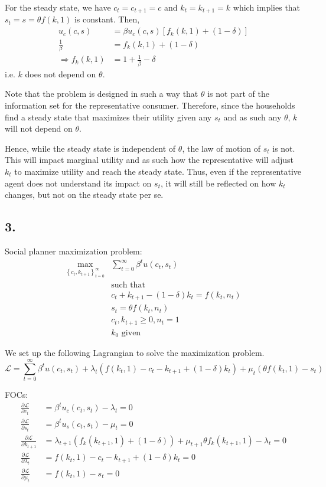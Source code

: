 \documentclass[12pt]{article}
\theoremstyle{definition}
\newcommand\st{\text{such that }}
\newcommand{\cbra}[1]{\left\{#1\right\}}
\begin{document}
For the steady state, we have $c_t=c_{t+1}=c$ and $k_t=k_{t+1}=k$ which implies that $s_t=s =\theta f(k,1)$ is constant. Then,
\begin{align*}
	u_c(c,s) & =\beta u_c(c,s)\left[f_k(k,1) + (1-\delta) \right]  \\
	\frac{1}{\beta} &= f_k(k,1) + (1-\delta)\\
	\Rightarrow f_k(k,1) &= 1 + \frac{1}{\beta} -\delta
\end{align*}
i.e. $k$ does not depend on $\theta$.

Note that the problem is designed in such a way that $\theta$ is not part of the information set for the representative consumer. Therefore, since the households find a steady state that maximizes their utility given any $s_t$ and as such any $\theta$, $k$ will not depend on $\theta$.

Hence, while the steady state is independent of $\theta$, the law of motion of $s_t$ is not. This will impact marginal utility and as such how the representative will adjust $k_t$ to maximize utility and reach the steady state. Thus, even if the representative agent does not understand its impact on $s_t$, it will still be reflected on how $k_t$ changes, but not on the steady state per se.

\subsection*{3.}

Social planner maximization problem:
	\begin{align*}
\max_{\cbra{c_t,k_{t+1}}_{t=0}^\infty} &\sum_{t=0}^{\infty}\beta^t u(c_t,s_t)\\
&\st\\
& c_t+k_{t+1}-(1-\delta)k_t = f(k_t,n_t)\\
& s_t=\theta f(k_t,n_t)\\
& c_t,k_{t+1}\geq 0, n_t=1\\
& k_0 \text{ given}
\end{align*}

We set up the following Lagrangian to solve the maximization problem.
\[
\mathcal{L} = \sum_{t=0}^{\infty}\beta^t u(c_t,s_t) + \lambda_t \left(  f(k_t,1)- c_t-k_{t+1}+(1-\delta)k_t \right) + \mu_t \left( \theta f(k_t,1) - s_t \right)
\]

FOCs:
\begin{align*}
\frac{\partial \mathcal{L}}{\partial c_t}& = \beta^tu_c(c_t,s_t) -\lambda_t = 0 \\
\frac{\partial \mathcal{L}}{\partial s_t}& = \beta^tu_s(c_t,s_t) -\mu_t = 0 \\
\frac{\partial \mathcal{L}}{\partial k_{t+1}} &= \lambda_{t+1} \left( f_k(k_{t+1},1) + (1-\delta)\right) +\mu_{t+1}\theta f_k(k_{t+1},1) - \lambda_t = 0\\
\frac{\partial \mathcal{L}}{\partial \lambda_t} &= f(k_t,1)- c_t-k_{t+1}+(1-\delta)k_t = 0\\
\frac{\partial \mathcal{L}}{\partial \mu_t} &= f(k_t,1) - s_t = 0
\end{align*}
\end{document}
